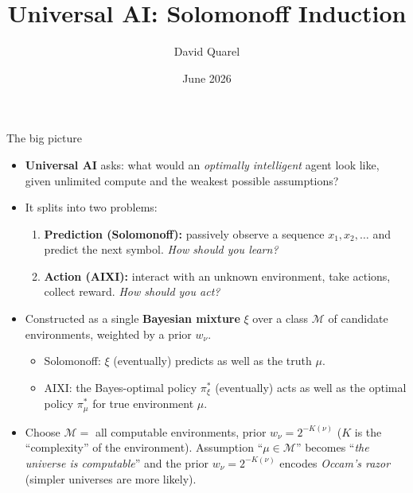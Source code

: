 \documentclass[10pt]{beamer}
\newcommand{\cM}{\mathcal{M}}
\begin{document}
\title[Solomonoff: a speedrun]{Universal AI: Solomonoff Induction}
\author[David Quarel]{David Quarel}
\date{June 2026}

\frame{\titlepage}

\begin{frame}{The big picture}
\begin{itemize}
    \item \textbf{Universal AI} asks: what would an \emph{optimally intelligent} agent look like, given unlimited compute and the weakest possible assumptions?
    \pause
    \item It splits into two problems:
    \begin{enumerate}
        \item \textbf{Prediction (Solomonoff):} passively observe a sequence $x_1, x_2, \ldots$ and predict the next symbol. \emph{How should you learn?}
        \pause
        \item \textbf{Action (AIXI):} interact with an unknown environment, take actions, collect reward. \emph{How should you act?}
    \end{enumerate}
    \pause
    \item Constructed as a single \textbf{Bayesian mixture} $\xi$ over a class $\cM$ of candidate environments, weighted by a prior $w_\nu$.
    \begin{itemize}
        \item Solomonoff: $\xi$ (eventually) predicts as well as the truth $\mu$.
        \item AIXI: the Bayes-optimal policy $\pi_\xi^*$ (eventually) acts as well as the optimal policy $\pi_\mu^*$ for true environment $\mu$.
    \end{itemize}
    \pause
    \item Choose $\cM=$ all computable environments, prior $w_\nu = 2^{-K(\nu)}$ ($K$ is the ``complexity'' of the environment). Assumption ``$\mu\in\cM$'' becomes ``\emph{the universe is computable}'' and the prior 
    $w_\nu = 2^{-K(\nu)}$ encodes \emph{Occam's razor} (simpler universes are more likely).
\end{itemize}
\end{frame}

\end{document}
